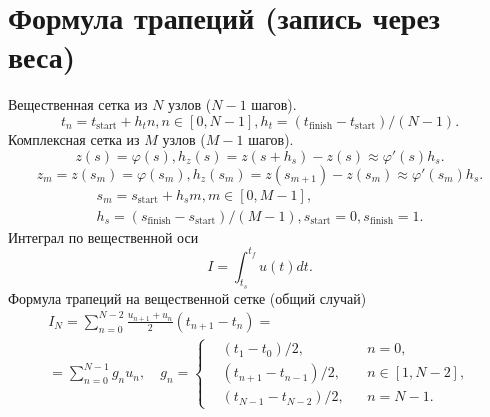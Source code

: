 \documentclass[12pt, a4paper]{article}
\begin{document}
	
	\section*{Формула трапеций (запись через веса)}
	Вещественная сетка из $N$ узлов ($N - 1$ шагов).
	\begin{equation}
		t_{n} = t_{\text{start}} + h_{t}n, n \in \left[0, N - 1\right], h_{t} = \left(t_{\text{finish}} - t_{\text{start}}\right) / \left(N - 1\right).
	\end{equation}
	Комплексная сетка из $M$ узлов ($M - 1$ шагов).
	\begin{equation}
		z\left(s\right) = \varphi\left(s\right), h_{z}\left(s\right)=z\left(s+h_{s}\right) - z\left(s\right) \approx \varphi'\left(s\right)h_{s}.
	\end{equation}
	\begin{equation}
		z_{m} = z\left(s_{m}\right) = \varphi\left(s_{m}\right), h_{z}\left(s_{m}\right)=z\left(s_{m+1}\right) - z\left(s_m\right) \approx \varphi'\left(s_{m}\right)h_{s}.
	\end{equation}
	\begin{multline}
		s_{m} = s_{\text{start}} + h_{s}m, m \in \left[0, M - 1\right],\\
		 h_{s} = \left(s_{\text{finish}} - s_{\text{start}}\right) / \left(M - 1\right), s_{\text{start}} = 0, s_{\text{finish}} = 1.
	\end{multline}
	Интеграл по вещественной оси
	\begin{equation}
		I=\int_{t_s}^{t_f}u\left(t\right)dt.
	\end{equation}
	Формула трапеций на вещественной сетке (общий случай)
	\begin{multline}
		I_{N} = \sum_{n = 0}^{N - 2}\frac{u_{n+1} + u_{n}}{2}\left(t_{n+1} - t_{n}\right) =\\
		=\sum_{n = 0}^{N - 1}g_{n}u_{n},\quad
		g_{n}=
		\left\{\begin{aligned}
			&\left(t_{1} - t_{0}\right)/2, &&n = 0,\\
			&\left(t_{n+1} - t_{n-1}\right)/2, &&n\in\left[1,N-2\right],\\
			&\left(t_{N-1} - t_{N-2}\right)/2, &&n=N-1.
		\end{aligned}\right.
	\end{multline}
\end{document}
